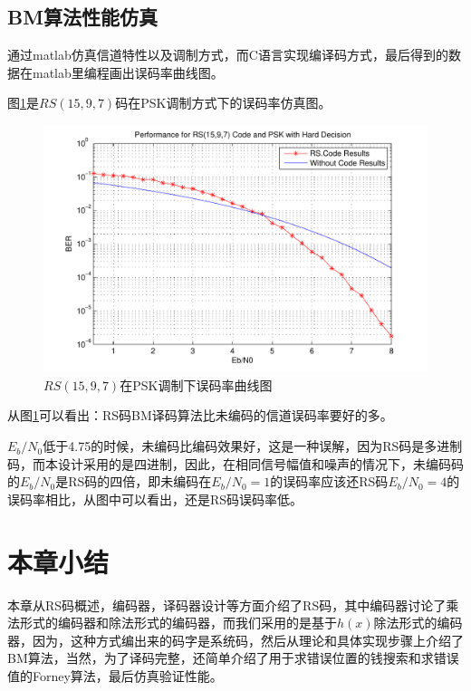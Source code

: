 \subsection{BM算法性能仿真}
通过matlab仿真信道特性以及调制方式，而C语言实现编译码方式，最后得到的数据在matlab里编程画出误码率曲线图。

图\ref{fig:4.5}是$RS(15,9,7)$码在PSK调制方式下的误码率仿真图。
\begin{figure}[htb]
  \begin{center}
    \includegraphics[width=\textwidth]{images/RS_BPSK.pdf}
  \end{center}
  \caption{$RS(15,9,7)$在PSK调制下误码率曲线图}
  \label{fig:4.5}
\end{figure}

从图\ref{fig:4.5}可以看出：RS码BM译码算法比未编码的信道误码率要好的多。

$E_b/N_0$低于4.75的时候，未编码比编码效果好，这是一种误解，因为RS码是多进制码，而本设计采用的是四进制，因此，在相同信号幅值和噪声的情况下，未编码码的$E_b/N_0$是RS码的四倍，即未编码在$E_b/N_0=1$的误码率应该还RS码$E_b/N_0=4$的误码率相比，从图中可以看出，还是RS码误码率低。


 
\section{本章小结}
本章从RS码概述，编码器，译码器设计等方面介绍了RS码，其中编码器讨论了乘法形式的编码器和除法形式的编码器，而我们采用的是基于$h(x)$除法形式的编码器，因为，这种方式编出来的码字是系统码，然后从理论和具体实现步骤上介绍了BM算法，当然，为了译码完整，还简单介绍了用于求错误位置的钱搜索和求错误值的Forney算法，最后仿真验证性能。
%
